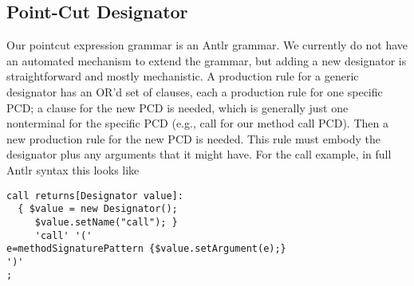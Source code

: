 \documentclass{report}
\begin{document}
\subsection{Point-Cut Designator} 
Our pointcut expression grammar is an Antlr grammar. We currently do not have an automated mechanism to extend the grammar, but adding a new designator is straightforward and mostly mechanistic. A production rule for a generic designator has an OR'd set of clauses, each a production rule for one specific PCD; a clause for the new PCD is needed, which is generally just one nonterminal for the specific PCD (e.g., call for our method call PCD). Then a new production rule for the new PCD is needed. This rule must embody the designator plus any arguments that it might have. For the call example, in full Antlr syntax this looks like
\begin{verbatim}
call returns[Designator value]:
  { $value = new Designator();
     $value.setName("call"); }
     'call' '('
e=methodSignaturePattern {$value.setArgument(e);}
')'
;
\end{verbatim}
\end{document}
